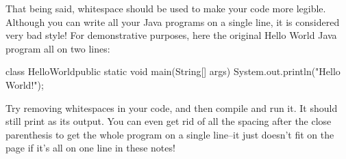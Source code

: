 That being said, whitespace should be used to make your code more legible. Although you can write all your Java programs on a single line, it is considered very bad style!
For demonstrative purposes, here the original Hello World Java program all on two lines:
\begin{code}
class HelloWorld{public static void main(String[] args)
    {System.out.println("Hello World!");}}
\end{code}
Try removing whitespaces in your code, and then compile and run it. It should still print  as its output. You can even get rid of all the spacing after the close parenthesis \ic{)} to get the whole program on a single line--it just doesn't fit on the page if it's all on one line in these notes!
